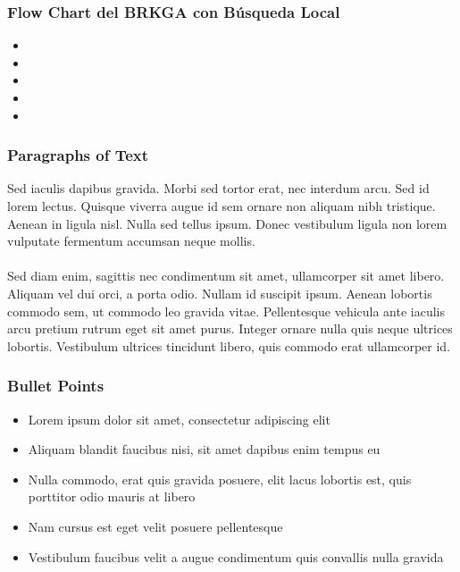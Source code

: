 \documentclass{beamer}
\begin{document}

\begin{frame}
\frametitle{Flow Chart del BRKGA con Búsqueda Local}

\begin{itemize}
    \item 
    \pause
    \item 
    \pause
    \item 
    \pause
    \item 
    \pause
    \item 
    \pause
\end{itemize}

\end{frame}


\begin{frame}

\frametitle{Paragraphs of Text}
Sed iaculis dapibus gravida. Morbi sed tortor erat, nec interdum arcu. Sed id lorem lectus. Quisque viverra augue id sem ornare non aliquam nibh tristique. Aenean in ligula nisl. Nulla sed tellus ipsum. Donec vestibulum ligula non lorem vulputate fermentum accumsan neque mollis.\\~\\

Sed diam enim, sagittis nec condimentum sit amet, ullamcorper sit amet libero. Aliquam vel dui orci, a porta odio. Nullam id suscipit ipsum. Aenean lobortis commodo sem, ut commodo leo gravida vitae. Pellentesque vehicula ante iaculis arcu pretium rutrum eget sit amet purus. Integer ornare nulla quis neque ultrices lobortis. Vestibulum ultrices tincidunt libero, quis commodo erat ullamcorper id.
\end{frame}


\begin{frame}
\frametitle{Bullet Points}
\begin{itemize}
\item Lorem ipsum dolor sit amet, consectetur adipiscing elit
\item Aliquam blandit faucibus nisi, sit amet dapibus enim tempus eu
\item Nulla commodo, erat quis gravida posuere, elit lacus lobortis est, quis porttitor odio mauris at libero
\item Nam cursus est eget velit posuere pellentesque
\item Vestibulum faucibus velit a augue condimentum quis convallis nulla gravida
\end{itemize}
\end{frame}
\end{document}

